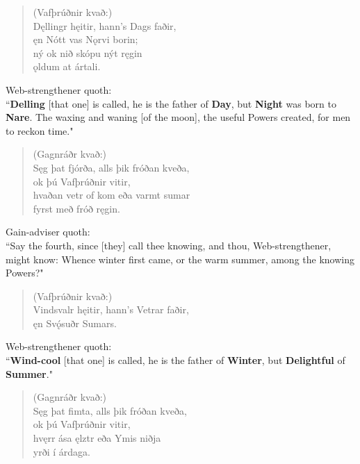 \begin{verse}
(Vafþrúðnir kvað:) \\%
\bva Dęllingr hęitir, \hld hann's Dags faðir, \\%
\ind ęn Nótt vas Nǫrvi borin; \\%
ný ok nið \hld skópu nýt ręgin \\%
\ind ǫldum at ártali.\\%
\end{verse}

\bvb Web-strengthener quoth: \\ “\textbf{Delling} [that one] is called, he is the father of \textbf{Day}, but \textbf{Night} was born to \textbf{Nare}. The waxing and waning [of the moon], the useful Powers created, for men to reckon time." \\

\begin{verse}
(Gagnráðr kvað:) \\%
\bva Sęg þat fjórða, \hld alls þik fróðan kveða, \\%
\ind ok þú Vafþrúðnir vitir, \\%
hvaðan vetr of kom \hld eða varmt sumar \\%
\ind fyrst með fróð ręgin.\\%
\end{verse}

\bvb Gain-adviser quoth: \\ “Say the fourth, since [they] call thee knowing, and thou, Web-strengthener, might know: Whence winter first came, or the warm summer, among the knowing Powers?" \\

\begin{verse}
(Vafþrúðnir kvað:) \\%
\bva Vindsvalr hęitir, \hld hann's Vetrar faðir, \\%
\ind ęn Svǫ́suðr Sumars.\footnotemark[15]\\%
\end{verse}

\bvb Web-strengthener quoth: \\ “\textbf{Wind-cool} [that one] is called, he is the father of \textbf{Winter}, but \textbf{Delightful} of \textbf{Summer}." \\

\begin{verse}
(Gagnráðr kvað:) \\%
\bva Sęg þat fimta, \hld alls þik fróðan kveða, \\%
\ind ok þú Vafþrúðnir vitir, \\%
hvęrr ása ęlztr \hld eða Ymis niðja \\%
\ind yrði í árdaga.\\%
\end{verse}

